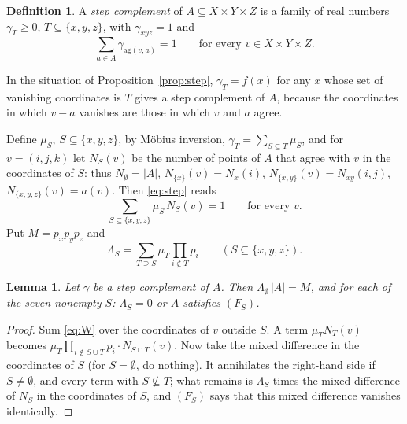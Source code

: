 \documentclass[11pt,a4paper]{amsart}
\newtheorem{lemma}[theorem]{Lemma}
\theoremstyle{definition}
\newtheorem{definition}[theorem]{Definition}
\theoremstyle{remark}
\begin{document}
\begin{definition}
A \emph{step complement} of $A\subseteq X\times Y\times Z$ is a family of real numbers $\gamma_T\ge 0$,
$T\subseteq\{x,y,z\}$, with $\gamma_{xyz}=1$ and
\begin{equation}\label{eq:step}
 \sum_{a\in A}\gamma_{\mathrm{ag}(v,a)}=1\qquad\text{for every } v\in X\times Y\times Z .
\end{equation}
\end{definition}

In the situation of Proposition~\ref{prop:step}, $\gamma_T=f(x)$ for any $x$ whose set of vanishing coordinates
is $T$ gives a step complement of $A$, because the coordinates in which $v-a$ vanishes are those in which $v$ and
$a$ agree.

Define $\mu_S$, $S\subseteq\{x,y,z\}$, by M\"obius inversion, $\gamma_T=\sum_{S\subseteq T}\mu_S$, and for
$v=(i,j,k)$ let $N_S(v)$ be the number of points of $A$ that agree with $v$ in the coordinates of $S$: thus
$N_\emptyset=|A|$, $N_{\{x\}}(v)=N_x(i)$, $N_{\{x,y\}}(v)=N_{xy}(i,j)$, $N_{\{x,y,z\}}(v)=a(v)$. Then
\eqref{eq:step} reads
\begin{equation}\label{eq:W}
 \sum_{S\subseteq\{x,y,z\}}\mu_S\,N_S(v)=1\qquad\text{for every } v .
\end{equation}
Put $M=p_xp_yp_z$ and
\[
 \Lambda_S=\sum_{T\supseteq S}\mu_T\prod_{i\notin T}p_i\qquad(S\subseteq\{x,y,z\}).
\]

\begin{lemma}\label{lem:dich}
Let $\gamma$ be a step complement of $A$. Then $\Lambda_\emptyset\,|A|=M$, and for each of the seven nonempty $S$:
$\Lambda_S=0$ or $A$ satisfies $(F_S)$.
\end{lemma}
\begin{proof}
Sum \eqref{eq:W} over the coordinates of $v$ outside $S$. A term $\mu_TN_T(v)$ becomes
$\mu_T\prod_{i\notin S\cup T}p_i\cdot N_{S\cap T}(v)$. Now take the mixed difference in the coordinates of $S$
(for $S=\emptyset$, do nothing). It annihilates the right-hand side if $S\ne\emptyset$, and every term with
$S\not\subseteq T$; what remains is $\Lambda_S$ times the mixed difference of $N_S$ in the coordinates of $S$,
and $(F_S)$ says that this mixed difference vanishes identically.
\end{proof}
\end{document}
